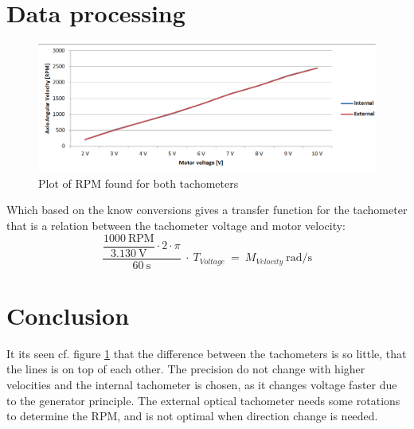 \section*{Data processing}

\begin{figure}[htbp]
	\centering
	\includegraphics[width=\textwidth]{figures/appendix/Motor&GearTests/RPMTest}
	\caption{Plot of RPM found for both tachometers}\label{fig:RPMTest}
\end{figure}

Which based on the know conversions gives a transfer function for the tachometer that is a relation between the tachometer voltage and motor velocity:
\begin{equation}
\dfrac{\dfrac{1000\ \text{RPM}}{3.130\ \text{V}} \cdot 2 \cdot \pi}{60\ \text{s}}\ \cdot\ T_{Voltage}\ =\ M_{Velocity}\ \text{rad/s}
\end{equation}

\section*{Conclusion}
It its seen cf. figure \ref{fig:RPMTest} that the difference between the tachometers is so little, that the lines is on top of each other. The precision do not change with higher velocities and the internal tachometer is chosen, as it changes voltage faster due to the generator principle. The external optical tachometer needs some rotations to determine the RPM, and is not optimal when direction change is needed.

